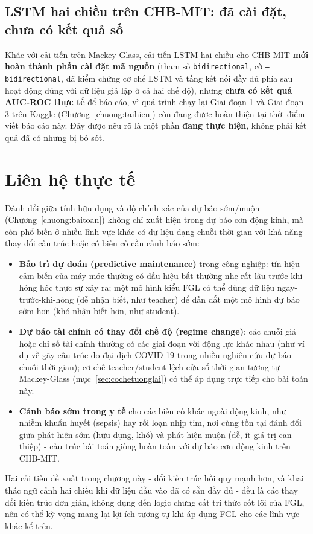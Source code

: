 \subsection{LSTM hai chiều trên CHB-MIT: đã cài đặt, chưa có kết quả số}

Khác với cải tiến trên Mackey-Glass, cải tiến LSTM hai chiều cho CHB-MIT \textbf{mới hoàn
thành phần cài đặt mã nguồn} (tham số \texttt{bidirectional}, cờ \texttt{--bidirectional}, đã
kiểm chứng cơ chế LSTM và tầng kết nối đầy đủ phía sau hoạt động đúng với dữ liệu giả lập ở cả
hai chế độ), nhưng \textbf{chưa có kết quả AUC-ROC thực tế} để báo cáo, vì quá trình chạy lại
Giai đoạn 1 và Giai đoạn 3 trên Kaggle (Chương~\ref{chuong:taihien}) còn đang được hoàn thiện
tại thời điểm viết báo cáo này. Đây được nêu rõ là một phần \textbf{đang thực hiện}, không phải
kết quả đã có nhưng bị bỏ sót.

\section{Liên hệ thực tế}

Đánh đổi giữa tính hữu dụng và độ chính xác của dự báo sớm/muộn (Chương~\ref{chuong:baitoan})
không chỉ xuất hiện trong dự báo cơn động kinh, mà còn phổ biến ở nhiều lĩnh vực khác có dữ
liệu dạng chuỗi thời gian với khả năng thay đổi cấu trúc hoặc có biến cố cần cảnh báo sớm:

\begin{itemize}
	\item \textbf{Bảo trì dự đoán (predictive maintenance)} trong công nghiệp: tín hiệu cảm
	biến của máy móc thường có dấu hiệu bất thường nhẹ rất lâu trước khi hỏng hóc thực sự xảy
	ra; một mô hình kiểu FGL có thể dùng dữ liệu ngay-trước-khi-hỏng (dễ nhận biết, như teacher)
	để dẫn dắt một mô hình dự báo sớm hơn (khó nhận biết hơn, như student).
	\item \textbf{Dự báo tài chính có thay đổi chế độ (regime change)}: các chuỗi giá hoặc chỉ
	số tài chính thường có các giai đoạn với động lực khác nhau (như ví dụ về gãy cấu trúc do
	đại dịch COVID-19 trong nhiều nghiên cứu dự báo chuỗi thời gian); cơ chế teacher/student
	lệch cửa sổ thời gian tương tự Mackey-Glass (mục~\ref{sec:cochetuonglai}) có thể áp dụng
	trực tiếp cho bài toán này.
	\item \textbf{Cảnh báo sớm trong y tế} cho các biến cố khác ngoài động kinh, như nhiễm
	khuẩn huyết (sepsis) hay rối loạn nhịp tim, nơi cùng tồn tại đánh đổi giữa phát hiện sớm
	(hữu dụng, khó) và phát hiện muộn (dễ, ít giá trị can thiệp) - cấu trúc bài toán giống
	hoàn toàn với dự báo cơn động kinh trên CHB-MIT.
\end{itemize}

Hai cải tiến đề xuất trong chương này - đổi kiến trúc hồi quy mạnh hơn, và khai thác ngữ
cảnh hai chiều khi dữ liệu đầu vào đã có sẵn đầy đủ - đều là các thay đổi kiến trúc đơn giản,
không đụng đến logic chưng cất tri thức cốt lõi của FGL, nên có thể kỳ vọng mang lại lợi ích
tương tự khi áp dụng FGL cho các lĩnh vực khác kể trên.
